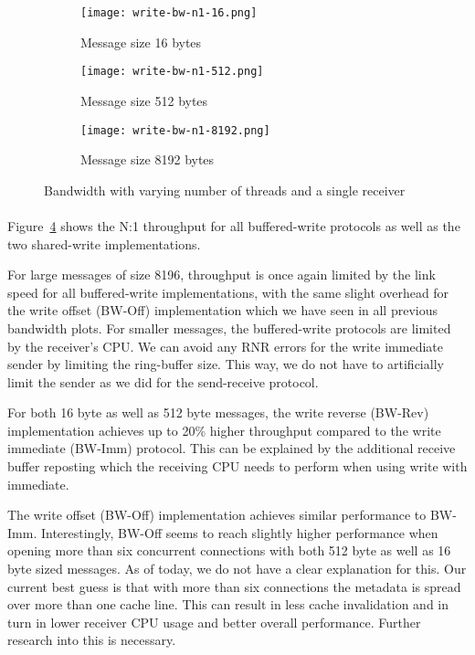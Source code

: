 \begin{figure}[ht]
  \centering
\begin{subfigure}[b]{0.49\textwidth}
  \centering
  \texttt{[image: write-bw-n1-16.png]}
  \caption{Message size 16 bytes}
  \label{fig:plot-write-bw-n1-16}
\end{subfigure}
\begin{subfigure}[b]{0.49\textwidth}
  \centering
  \texttt{[image: write-bw-n1-512.png]}
  \caption{Message size 512 bytes}
  \label{fig:plot-write-bw-n1-512}
\end{subfigure}
\begin{subfigure}[b]{0.49\textwidth}
  \centering
  \texttt{[image: write-bw-n1-8192.png]}
  \caption{Message size 8192 bytes}
  \label{fig:plot-write-bw-n1-8192}
\end{subfigure}
  \caption{Bandwidth with varying number of threads and a single receiver}
  \label{fig:plot-write-bw-n1}
\end{figure}

\paragraph{} Figure~\ref{fig:plot-write-bw-n1} shows the N:1 throughput for all buffered-write protocols as 
well as the two shared-write implementations.

For large messages of size 8196, throughput is once again limited by the link speed for all buffered-write implementations, 
with the same slight overhead for the write offset (BW-Off) implementation which we have seen in all previous bandwidth plots.
For smaller messages, the buffered-write protocols are limited by the receiver's CPU. We can avoid any 
RNR errors for the write immediate sender by limiting the ring-buffer size. This way, we do not have to artificially limit 
the sender as we did for the send-receive protocol.

For both 16 byte as well as 512 byte messages, the write reverse \mbox{(BW-Rev)} implementation achieves up to 20\% higher throughput
compared to the write immediate (BW-Imm) protocol. This can be explained by the additional  receive buffer reposting
which the receiving CPU needs to perform when using write with immediate. 

The write offset (BW-Off) implementation achieves similar performance to BW-Imm. Interestingly, BW-Off seems to reach
slightly higher performance when opening more than six concurrent connections with both 512 byte as well as 16 byte
sized messages. As of
today, we do not have a clear explanation for this. Our current best guess is that with more than six connections the 
metadata is spread over more than one cache line. This can result in less cache invalidation and in turn in lower receiver 
CPU usage and better overall performance. Further research into this is necessary. 


